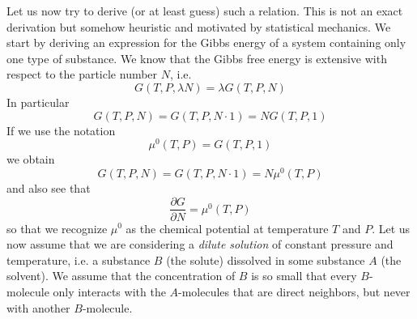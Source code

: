 \documentclass[a4paper, draft]{article}
\theoremstyle{own}
\theoremstyle{remark}
\begin{document}
Let us now try to derive (or at least guess) such a relation. This is not an exact derivation but somehow heuristic and motivated by statistical mechanics. We start by deriving an expression for the Gibbs energy of a system containing only one type of substance. We know that the Gibbs free energy is extensive with respect to the particle number $N$, i.e. 
$$
G(T, P, \lambda N) = \lambda G(T, P, N)
$$
In particular
$$
G(T, P, N) = G(T, P, N \cdot 1) = N G(T, P, 1)
$$
If we use the notation
$$
\mu^0 (T, P) = G(T, P, 1)
$$
we obtain
$$
G(T, P, N) = G(T, P, N \cdot 1) = N \mu^0 (T, P)
$$
and also see that 
$$
\frac{\partial G}{ \partial N} = \mu^0 (T, P)
$$
so that we recognize $\mu^0$ as the chemical potential at temperature $T$ and $P$. Let us now assume that we are considering a {\em dilute solution} of constant pressure and temperature, i.e. a substance $B$ (the solute) dissolved in some substance $A$ (the solvent). We assume that the concentration of $B$ is so small that every $B$-molecule only interacts with the $A$-molecules that are direct neighbors, but never with another $B$-molecule. 
\end{document}
